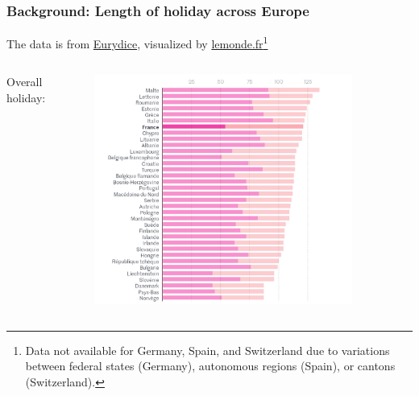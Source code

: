 \documentclass[10pt,mathserif,aspectratio=169]{beamer}
\begin{document}
\begin{frame}[label=background1]
  \frametitle{Background: Length of holiday across Europe}
  The data is from \href{https://op.europa.eu/en/publication-detail/-/publication/080f40cc-63d3-11ed-92ed-01aa75ed71a1/language-en/format-PDF/source-275370246}{Eurydice}, visualized by \href{https://www.lemonde.fr/les-decodeurs/article/2023/08/29/rythmes-scolaires-la-france-a-t-elle-les-plus-longues-vacances-en-europe_6186976_4355770.html}{lemonde.fr}\footnote{Data not available for Germany, Spain, and Switzerland due to variations between federal states (Germany), autonomous regions (Spain), or cantons (Switzerland).}
  \begin{columns}[T,onlytextwidth]
    Overall holiday:
    \begin{figure}
      \centering
      \includegraphics[width=0.9\textwidth]{../Figures/holiday_all.png}
    \end{figure}


\end{columns}
\end{frame}
\end{document}
